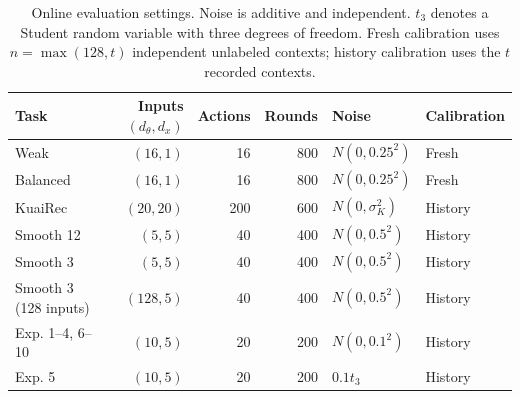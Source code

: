 \begin{table}[htbp]
\centering\small
\caption{Online evaluation settings. Noise is additive and independent. $t_3$ denotes a Student random variable with three degrees of freedom. Fresh calibration uses $n=\max(128,t)$ independent unlabeled contexts; history calibration uses the $t$ recorded contexts.}
\label{tab:online-protocol}
\begin{tabular}{@{}lrrrll@{}}
\toprule
Task & Inputs $(d_\theta,d_x)$ & Actions & Rounds & Noise & Calibration \\
\midrule
Weak & $(16,1)$ & 16 & 800 & $N(0,0.25^2)$ & Fresh \\
Balanced & $(16,1)$ & 16 & 800 & $N(0,0.25^2)$ & Fresh \\
KuaiRec & $(20,20)$ & 200 & 600 & $N(0,\sigma_K^2)$ & History \\
Smooth 12 & $(5,5)$ & 40 & 400 & $N(0,0.5^2)$ & History \\
Smooth 3 & $(5,5)$ & 40 & 400 & $N(0,0.5^2)$ & History \\
Smooth 3 (128 inputs) & $(128,5)$ & 40 & 400 & $N(0,0.5^2)$ & History \\
Exp. 1--4, 6--10 & $(10,5)$ & 20 & 200 & $N(0,0.1^2)$ & History \\
Exp. 5 & $(10,5)$ & 20 & 200 & $0.1t_3$ & History \\
\bottomrule
\end{tabular}
\end{table}

